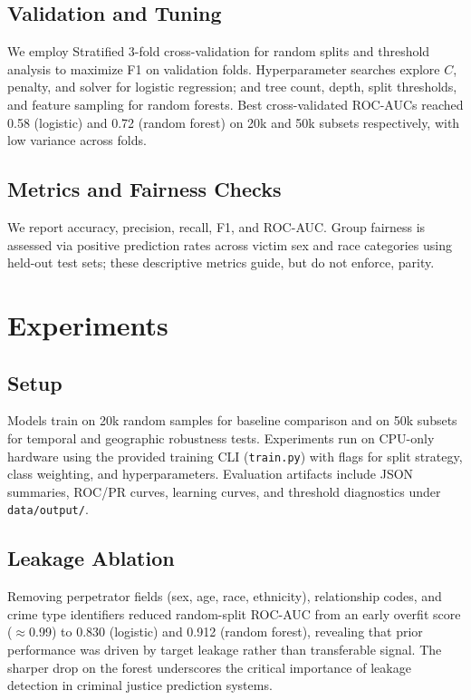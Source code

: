 \documentclass[sigconf]{acmart}
\begin{document}
\subsection{Validation and Tuning}
We employ Stratified 3-fold cross-validation for random splits and threshold analysis to maximize F1 on validation folds. Hyperparameter searches explore $C$, penalty, and solver for logistic regression; and tree count, depth, split thresholds, and feature sampling for random forests. Best cross-validated ROC-AUCs reached 0.58 (logistic) and 0.72 (random forest) on 20k and 50k subsets respectively, with low variance across folds.

\subsection{Metrics and Fairness Checks}
We report accuracy, precision, recall, F1, and ROC-AUC. Group fairness is assessed via positive prediction rates across victim sex and race categories using held-out test sets; these descriptive metrics guide, but do not enforce, parity.

\section{Experiments}
\subsection{Setup}
Models train on 20k random samples for baseline comparison and on 50k subsets for temporal and geographic robustness tests. Experiments run on CPU-only hardware using the provided training CLI (\texttt{train.py}) with flags for split strategy, class weighting, and hyperparameters. Evaluation artifacts include JSON summaries, ROC/PR curves, learning curves, and threshold diagnostics under \texttt{data/output/}.

\subsection{Leakage Ablation}
Removing perpetrator fields (sex, age, race, ethnicity), relationship codes, and crime type identifiers reduced random-split ROC-AUC from an early overfit score ($\approx$0.99) to 0.830 (logistic) and 0.912 (random forest), revealing that prior performance was driven by target leakage rather than transferable signal. The sharper drop on the forest underscores the critical importance of leakage detection in criminal justice prediction systems.
\end{document}
